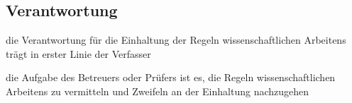 \documentclass[a4paper,oneside,DIV8,10pt]{scrartcl}
\begin{document}
    \subsection{Verantwortung}
    \begin{compactitem}
        \item die Verantwortung für die Einhaltung der Regeln wissenschaftlichen 
        Arbeitens trägt in erster Linie der Verfasser
        \item die Aufgabe des Betreuers oder Prüfers ist es, die Regeln 
        wissenschaftlichen Arbeitens zu vermitteln und Zweifeln an der 
        Einhaltung nachzugehen
    \end{compactitem}
\end{document}
